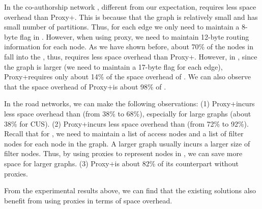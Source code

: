 In the co-authorship network \dblpone, different from our expectation, \arcflag requires less space overhead than Proxy+\arcflag. This is because that the graph is relatively small and has small number of partitions. Thus, for each edge we only need to maintain a 8-byte flag in \arcflag. However, when using proxy, we need to maintain 12-byte routing information for each node. As we have shown before, about 70\% of the nodes in \dblpone fall into the \dras, thus, \arcflag requires less space overhead than Proxy+\arcflag. However, in \dblp, since the graph is larger (we need to maintain a 17-byte flag for each edge), Proxy+\arcflag requires only about 14\% of the space overhead of \arcflag. We can also observe that the space overhead of Proxy+\tnr is about 98\% of \tnr.

In the road networks, we can make the following observations: (1) Proxy+\arcflag incurs less space overhead than \arcflag (from 38\% to 68\%), especially for large graphs (about 38\% for CUS). (2) Proxy+\tnr incurs less space overhead than \tnr (from 72\% to 92\%). Recall that for \tnr, we need to maintain a list of access nodes and a list of filter nodes for each node in the graph. A larger graph usually incurs a larger size of filter nodes. Thus, by using proxies to represent nodes in \dras, we can save more space for larger graphs. (3) Proxy+\ah is about 82\% of its counterpart without proxies.



From the experimental results above, we can find that the existing solutions also benefit from using proxies in terms of space overhead.





















